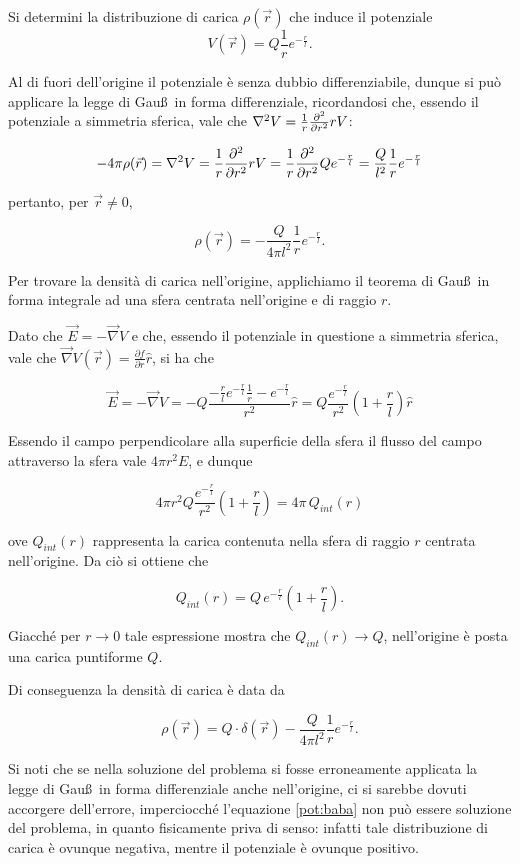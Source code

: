 \documentclass[../main.tex]{subfiles}
\begin{document}

\textex

Si determini la distribuzione di carica $\rho(\vec{r})$ che induce il potenziale
\begin{displaymath}
V(\vec{r})=Q\frac{1}{r}e^{-\frac{r}{l}}.
\end{displaymath}


\solution

 Al di fuori dell'origine il potenziale è senza dubbio differenziabile, dunque si può applicare la legge di Gau\ss\ in forma
 differenziale, ricordandosi che, essendo il potenziale a simmetria sferica, vale che
 $\nabla^2 V=\frac{1}{r}\frac{\partial^2}{\partial r^2}rV$:
 
 $$-4\pi\rho(\vec{r})=\nabla^2 V=\frac{1}{r}\frac{\partial^2}{\partial r^2}rV=
 \frac{1}{r}\frac{\partial^2 }{\partial r^2}Qe^{-\frac{r}{l} }=\frac{Q}{l^2}\frac{1}{r}e^{- \frac{r}{l}}$$
 
 pertanto, per $\vec{r}\ne 0$,
 
  \begin{equation}\label{pot:baba}
  \rho(\vec{r})=-\frac{Q}{4\pi l^2}\frac{1}{r}e^{- \frac{r}{l}}.
  \end{equation}
 
 Per trovare la densità di carica nell'origine, applichiamo il teorema di Gau\ss\ in forma integrale ad una sfera centrata
 nell'origine e di raggio $r$.

 Dato che $\vec{E}=-\vec{\nabla}V$ e che, essendo il potenziale in questione a simmetria sferica, vale che
 $\vec{\nabla}V(\vec{r})=\frac{\partial f}{\partial r}\hat{r}$, si ha che

  $$\vec{E}=-\vec{\nabla}V=-Q \frac{-\frac{r}{l}e^{-\frac{r}{l}}\frac{1}{r}-e^{-\frac{r}{l}}}{r^2}\hat{r}=
  Q\frac{e^{-\frac{r}{l}}}{r^2}\left(1+\frac{r}{l}\right)\hat{r}$$
  
 Essendo il campo perpendicolare alla superficie della sfera il flusso del campo attraverso la sfera vale $4\pi r^2 E$,
 e dunque
 
  $$4\pi r^2Q\frac{e^{-\frac{r}{l}}}{r^2}\left(1+\frac{r}{l}\right)=4\pi\, Q_{int}(r)$$
 
 ove $Q_{int}(r)$ rappresenta la carica contenuta nella sfera di raggio $r$ centrata nell'origine. Da ciò si ottiene che
 
 $$Q_{int}(r)=Q\, e^{-\frac{r}{l}}\left(1+\frac{r}{l}\right).$$
 
 Giacché per $r\to 0$ tale espressione mostra che $Q_{int}(r)\to Q$, nell'origine è posta una carica puntiforme $Q$.
 
 Di conseguenza la densità di carica è data da
 
 $$\rho(\vec{r})=Q\cdot\delta(\vec{r})-\frac{Q}{4\pi l^2}\frac{1}{r}e^{- \frac{r}{l}}.$$
 
 Si noti che se nella soluzione del problema si fosse erroneamente applicata la legge di Gau\ss\ in forma differenziale anche
 nell'origine, ci si sarebbe dovuti accorgere dell'errore, imperciocché l'equazione \ref{pot:baba} non può essere soluzione del
 problema, in quanto fisicamente priva di senso: infatti tale distribuzione di carica è ovunque negativa, mentre il potenziale
 è ovunque positivo.
\end{document}
